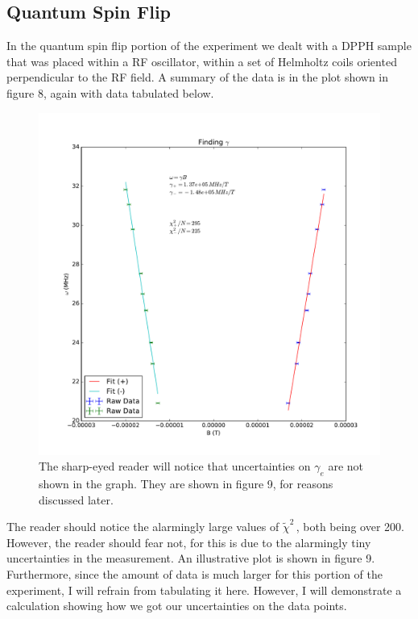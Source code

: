 \documentclass{article}
\newcommand{\redchi}{$\tilde{\chi}^2\,$}
\begin{document}
	\subsection{Quantum Spin Flip}
	In the quantum spin flip portion of the experiment we dealt with a DPPH sample that was placed within a RF oscillator, within a set of Helmholtz coils oriented perpendicular to the RF field.  A summary of the data is in the plot shown in figure 8, again with data tabulated below.

	\begin{figure}[!htb]
		\centering
		\includegraphics[scale=.5]{../plots/findinggamma.pdf}
		\caption{The sharp-eyed reader will notice that uncertainties on $\gamma_e$ are not shown in the graph.  They are shown in figure 9, for reasons discussed later.}
	\end{figure}

	The reader should notice the alarmingly large values of \redchi, both being over 200.  However, the reader should fear not, for this is due to the alarmingly tiny uncertainties in the measurement.  An illustrative plot is shown in figure 9.  Furthermore, since the amount of data is much larger for this portion of the experiment, I will refrain from tabulating it here.  However, I will demonstrate a calculation showing how we got our uncertainties on the data points.
\end{document}
